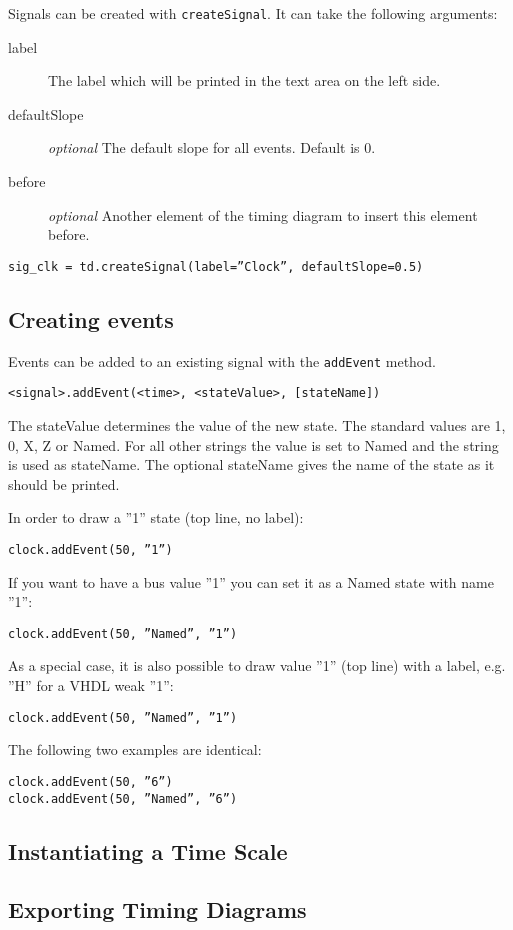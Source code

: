 \documentclass[11pt]{article}
\begin{document}
Signals can be created with \texttt{createSignal}. It can take the following
arguments:

\begin{description}
\item[label] The label which will be printed in the text area on the left side.
\item[defaultSlope] \emph{optional} The default slope for all events. Default is 0.
\item[before] \emph{optional} Another element of the timing diagram to insert this element before.  
\end{description}

\begin{center}
  \texttt{sig\_clk = td.createSignal(label=''Clock'', defaultSlope=0.5)}
\end{center}

\subsection{Creating events}
\label{sec:evt}

Events can be added to an existing signal with the \texttt{addEvent} method.

\texttt{<signal>.addEvent(<time>, <stateValue>, [stateName])}

The stateValue determines the value of the new state. The standard values are 1,
0, X, Z or Named. For all other strings the value is set to Named and the string
is used as stateName. 
The optional stateName gives the name of the state as it should be printed. 

In order to draw a ''1'' state (top line, no label):

\texttt{clock.addEvent(50, ''1'')}

If you want to have a bus value ''1'' you can set it as a Named state with name ''1'':

\texttt{clock.addEvent(50, ''Named'', ''1'')}

As a special case, it is also possible to draw value ''1'' (top line) with a
label, e.g. ''H'' for a VHDL weak ''1'':

\texttt{clock.addEvent(50, ''Named'', ''1'')}

The following two examples are identical:

\texttt{clock.addEvent(50, ''6'')}\\
\texttt{clock.addEvent(50, ''Named'', ''6'')}



\subsection{Instantiating a Time Scale}
\label{sec:tis}



\subsection{Exporting Timing Diagrams}
\label{sec:exp}
\end{document}
